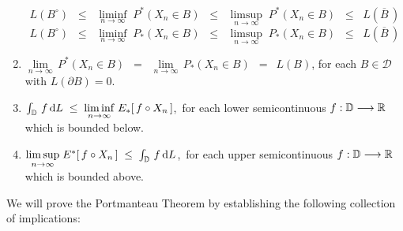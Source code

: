 \begin{theorem}
\begin{enumerate}
	\begin{equation*}
	L(B^{\circ})
	\;\; \leq \;\;
		\underset{n\rightarrow\infty}{\liminf}\; P^{*}(X_{n} \in B)
	\;\; \leq \;\;
		\underset{n\rightarrow\infty}{\limsup}\; P^{*}(X_{n} \in B)
	\;\; \leq \;\;
		L(\overline{B}\,)
	\end{equation*}
	\begin{equation*}
	L(B^{\circ})
	\;\;\leq\;\;
		\underset{n\rightarrow\infty}{\liminf}\; P_{*}(X_{n} \in B)
	\;\;\leq\;\;
		\underset{n\rightarrow\infty}{\limsup}\; P_{*}(X_{n} \in B)
	\;\;\leq\;\;
		L(\overline{B}\,)
	\end{equation*}
\item
	$\underset{n\rightarrow\infty}{\lim}\,P^{*}(X_{n} \in B)$
	\,$=$\, $\underset{n\rightarrow\infty}{\lim}\,P_{*}(X_{n} \in B)$
	\,$=$\, $L(B)$,
	for each $B \in \mathcal{D}$ with $L(\partial B) = 0$.
\item
	$\int_{\mathbb{D}}\, f \,\textnormal{d} L \;\leq\; \underset{n\rightarrow\infty}{\liminf}\; E_{*}\!\left[\,f \circ X_{n}\,\right]$,\,
	for each lower semicontinuous $f : \mathbb{D} \longrightarrow \mathbb{R}$ which is bounded below.
\item
	$\underset{n\rightarrow\infty}{\limsup}\; E^{*}\!\left[\,f \circ X_{n}\,\right] \;\leq\; \int_{\mathbb{D}}\, f \,\textnormal{d} L$,\,
	for each upper semicontinuous $f : \mathbb{D} \longrightarrow \mathbb{R}$ which is bounded above.
\end{enumerate}
\end{theorem}
\proof
We will prove the Portmanteau Theorem by establishing the following collection
of implications:
\vskip 0.5cm
\begin{center}
\end{center}


